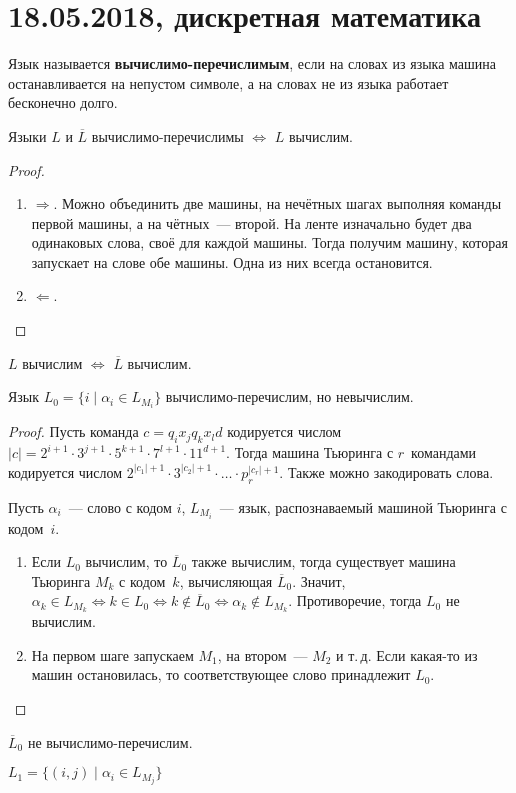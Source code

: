 \chapter{18.05.2018, дискретная математика}
Язык называется \textbf{вычислимо-перечислимым}, если на словах из языка машина останавливается на непустом символе, а на словах не из языка работает бесконечно долго.

\begin{statement}
Языки $L$ и $\overline L$ вычислимо-перечислимы $\Leftrightarrow$ $L$ вычислим.
\end{statement}
\begin{proof}
\begin{enumerate}
	\item $\Rightarrow$.
	Можно объединить две машины, на нечётных шагах выполняя команды первой машины, а на чётных~--- второй.
	На ленте изначально будет два одинаковых слова, своё для каждой машины.
	Тогда получим машину, которая запускает на слове обе машины.
	Одна из них всегда остановится.
	
	\item $\Leftarrow$. 
\end{enumerate}
\end{proof}

\begin{statement}
$L$ вычислим $\Leftrightarrow$ $\overline L$ вычислим.
\end{statement}

\begin{theorem}
Язык $L_0 = \{ i \mid \alpha_i \in L_{M_i} \}$ вычислимо-перечислим, но невычислим.
\end{theorem}
\begin{proof}
Пусть команда $c = q_i x_j q_k x_l d$ кодируется числом $|c| = 2^{i+1} \cdot 3^{j+1} \cdot 5^{k+1} \cdot 7^{l+1} \cdot 11^{d+1}$.
Тогда машина Тьюринга с $r$~командами кодируется числом $2^{|c_1| + 1} \cdot 3^{|c_2| + 1} \cdot \ldots \cdot p_r^{|c_r| + 1}$.
Также можно закодировать слова.

Пусть $\alpha_i$~--- слово с кодом $i$, $L_{M_i}$~--- язык, распознаваемый машиной Тьюринга с кодом~$i$.

\begin{enumerate}
	\item Если $L_0$ вычислим, то $\overline L_0$ также вычислим, тогда существует машина Тьюринга $M_k$ с кодом~$k$, вычисляющая $\overline L_0$.
	Значит, $\alpha_k \in L_{M_k} \Leftrightarrow
	k \in L_0 \Leftrightarrow
	k \notin \overline L_0 \Leftrightarrow
	\alpha_k \notin L_{M_k}$.
	Противоречие, тогда $L_0$ не вычислим.
	
	\item На первом шаге запускаем $M_1$, на втором~--- $M_2$ и т.\,д.
	Если какая-то из машин остановилась, то соответствующее слово принадлежит $L_0$.
\end{enumerate}
\end{proof}

\begin{consequent}
$\overline L_0$ не вычислимо-перечислим.
\end{consequent}

\begin{theorem}
$L_1 = \{ (i, j) \mid \alpha_i \in L_{M_j} \}$
\end{theorem}